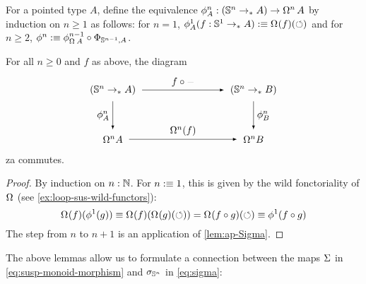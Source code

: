\documentclass[english,a4]{article}
\newcommand{\ptdto}{\to_\ast}%
\begin{document}
For a pointed type $A$, define the equivalence $\phi_A^n: (\Sn n \ptdto A) \to
\loopspace n A$ by induction on $n\geq 1$ as follows: for $n=1$,
$\phi_A^1(f:\Sc \ptdto A) \defequi \loopspace\null (f)(\Sloop)$ and for $n\geq
2$, $\phi^n \defequi \phi_{\loopspace\null A}^{n-1} \circ \Phi_{\Sn {n-1},A}$.
\begin{corollary}\label{lem:iterated-ap-Sigma}
    For all $n \geq 0$ and $f$ as above, the diagram
    \begin{equation}
    \begin{tikzpicture}[x=5cm,y=-1.75cm,baseline=(current bounding box.center)]
    \tikzset{arrow/.style={shorten >=0.1cm,shorten <=.1cm,-latex}}
    \node (A) at (0,0) {$(\Sn n \to_* A)$}; 
    \node (D) at (1,0) {$(\Sn n \to_* B)$}; 
    \node (B) at (0,1) {$\Omega^n A$}; 
    \node (C) at (1,1) {$\Omega^n B$}; 
    
    \draw[arrow] (A) to node [above] {$f \circ \blank$} (D);
    \draw[arrow] (A) to node [left] {$\phi_A^n$} (B);
    \draw[arrow] (B) to node [above] {$\Omega^n(f)$} (C);
    \draw[arrow] (D) to node [right] {$\phi_B^n$} (C);
    \end{tikzpicture}
    \end{equation}za
    commutes.
\end{corollary}
\begin{proof}
  By induction on $n:\mathbb{N}$. For $n\mathrel{\hbox{:}\mkern-5mu\equiv} 1$, this is given by the wild fonctoriality of
  $\loopspace\null$ (see \cref{ex:loop-sus-wild-functors}):
  \begin{displaymath}
    \loopspace \null (f) (\phi^1 (g)) \jdeq \loopspace\null(f)(\loopspace\null(g)(\Sloop))
    =\loopspace\null(f\circ g)(\Sloop) \jdeq \phi^1(f\circ g)
  \end{displaymath}
  The step from $n$ to $n+1$ is an application of \cref{lem:ap-Sigma}.
\end{proof}


The above lemmas allow us to formulate a connection between the maps $\operatorname{\Sigma}$ in
\eqref{eq:susp-monoid-morphism} and $\sigma_{{\mathbb S^{n}}}$ in \eqref{eq:sigma}:
\end{document}
